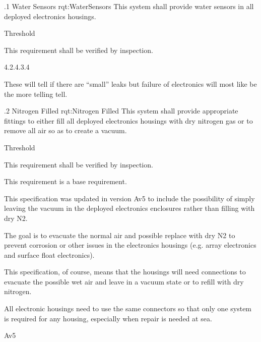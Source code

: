 \ONERQMT
{\RqtNumberBase.1}
{Water Sensors}
{rqt:WaterSensors}
{
This system shall provide water sensors in all deployed electronics housings.
}
{
	\item [Phase 1] Threshold
}
{This requirement shall be verified by inspection.}
{
	\item [\TBD] 4.2.4.3.4
}
{
	\item These will tell if there are ``small'' leaks but failure of electronics will most like be the more telling tell.
}


\ONERQMTV
{\RqtNumberBase.2}
{Nitrogen Filled}
{rqt:Nitrogen Filled}
{
This system shall provide appropriate fittings to either fill all deployed electronics housings with dry nitrogen gas or to remove all air so as to create a vacuum.%
}
{
	\item [Phase 1] Threshold
}
{This requirement shall be verified by inspection.}
{
	\item [N/A] This requirement is a base requirement.
}
{
	\item This specification was updated in version Av5 to include the possibility of simply leaving the vacuum in the deployed electronics enclosures rather than filling with dry N2.
	\item The goal is to evacuate the normal air and possible replace with dry N2 to prevent corrosion or other issues in the electronics housings (e.g. array electronics and surface float electronics).
	\item This specification, of course, means that the housings will need connections to evacuate the possible wet air and leave in a vacuum state or to refill with dry nitrogen.
	\item All electronic housings need to use the same connectors so that only one system is required for any housing, especially when repair is needed at sea.
}
{Av5}



